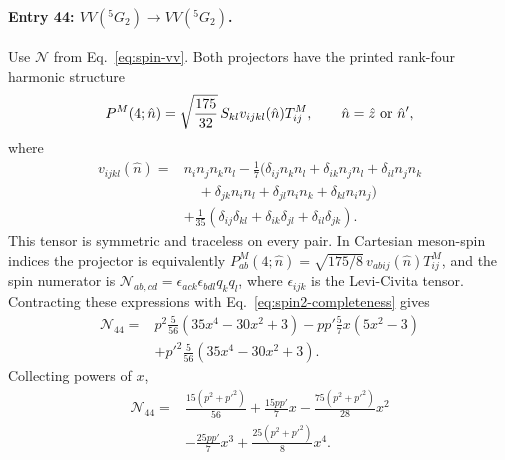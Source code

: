 \paragraph{Entry 44: $VV({}^5G_2)\to VV({}^5G_2)$.}
Use $\mathcal N$ from Eq.~\eqref{eq:spin-vv}. Both projectors have the
printed rank-four harmonic structure
\begin{equation}
 P^M(4;\hat n)=\sqrt{\frac{175}{32}}\,S_{kl}v_{ijkl}(\hat n)T^M_{ij},
 \qquad \hat n=\hat z\ \hbox{or}\ \hat n',
\end{equation}
where
\begin{equation}
\begin{split}
 v_{ijkl}(\hat n)={}&n_in_jn_kn_l
 -\tfrac17(\delta_{ij}n_kn_l+\delta_{ik}n_jn_l
 +\delta_{il}n_jn_k\\
 &\quad+\delta_{jk}n_in_l+\delta_{jl}n_in_k+\delta_{kl}n_in_j)\\
 &+\tfrac1{35}(\delta_{ij}\delta_{kl}
 +\delta_{ik}\delta_{jl}+\delta_{il}\delta_{jk}).
\end{split}
\end{equation}
This tensor is symmetric and traceless on every pair. In Cartesian
meson-spin indices the projector is equivalently
$P^M_{ab}(4;\hat n)=\sqrt{175/8}\,v_{abij}(\hat n)T^M_{ij}$,
and the spin numerator is
$\mathcal N_{ab,cd}=\epsilon_{ack}\epsilon_{bdl}q_kq_l$, where
$\epsilon_{ijk}$ is the Levi-Civita tensor. Contracting these expressions
with Eq.~\eqref{eq:spin2-completeness} gives
\begin{equation}
\begin{split}
 \mathcal N_{44}={}&
 p^2\frac5{56}(35x^4-30x^2+3)
 -pp'\frac57x(5x^2-3)\\
 &+p'^2\frac5{56}(35x^4-30x^2+3).
\end{split}
\end{equation}
Collecting powers of $x$,
\begin{equation}
\begin{split}
 \mathcal N_{44}={}&\frac{15(p^2+p'^2)}{56}
 +\frac{15pp'}7x-\frac{75(p^2+p'^2)}{28}x^2\\
 &-\frac{25pp'}7x^3+\frac{25(p^2+p'^2)}8x^4.
\end{split}
\end{equation}

